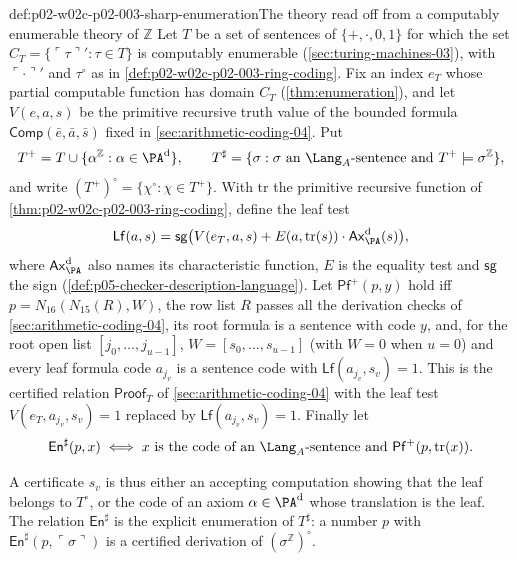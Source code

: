 \begin{hbdefinition}{def:p02-w02c-p02-003-sharp-enumeration}{The theory read off from a computably enumerable theory of \(\mathbb Z\)}
Let \(T\) be a set of sentences of \(\{+,\cdot,0,1\}\) for which the set
\(C_T=\{\ulcorner\tau\urcorner':\tau\in T\}\) is computably enumerable
(\cref{sec:turing-machines-03}), with \(\ulcorner\cdot\urcorner'\) and
\(\tau^{\circ}\) as in \cref{def:p02-w02c-p02-003-ring-coding}.  Fix an
index \(e_T\) whose partial computable function has domain \(C_T\)
(\cref{thm:enumeration}), and let \(V(e,a,s)\) be the primitive recursive
truth value of the bounded formula
\(\mathsf{Comp}(\bar e,\bar a,\bar s)\) fixed in
\cref{sec:arithmetic-coding-04}.  Put
\[
 T^{+}=T\cup\{\alpha^{\mathbb Z}:\alpha\in\PA^{\rm d}\},\qquad
 T^{\sharp}=\{\sigma:\sigma\text{ an }\Lang_A\text{-sentence and }
 T^{+}\models\sigma^{\mathbb Z}\},
\]
and write \((T^{+})^{\circ}=\{\chi^{\circ}:\chi\in T^{+}\}\).  With
\(\mathrm{tr}\) the primitive recursive function of
\cref{thm:p02-w02c-p02-003-ring-coding}, define the leaf test
\[
 \mathsf{Lf}(a,s)=\mathsf{sg}\bigl(V(e_T,a,s)
       +E(a,\mathrm{tr}(s))\cdot\mathsf{Ax}^{\rm d}_{\PA}(s)\bigr),
\]
where \(\mathsf{Ax}^{\rm d}_{\PA}\) also names its characteristic
function, \(E\) is the equality test and \(\mathsf{sg}\) the sign
(\cref{def:p05-checker-description-language}).  Let
\(\mathsf{Pf}^{+}(p,y)\) hold iff \(p=N_{16}(N_{15}(R),W)\), the row list
\(R\) passes all the derivation checks of \cref{sec:arithmetic-coding-04},
its root formula is a sentence with code \(y\), and, for the root open list
\([j_0,\ldots,j_{u-1}]\), \(W=[s_0,\ldots,s_{u-1}]\) (with \(W=0\) when
\(u=0\)) and every leaf formula code \(a_{j_v}\) is a sentence code with
\(\mathsf{Lf}(a_{j_v},s_v)=1\).  This is the certified relation
\(\mathsf{Proof}_T\) of \cref{sec:arithmetic-coding-04} with the leaf test
\(V(e_T,a_{j_v},s_v)=1\) replaced by \(\mathsf{Lf}(a_{j_v},s_v)=1\).
Finally let
\[
 \mathsf{En}^{\sharp}(p,x)\iff x\text{ is the code of an }
 \Lang_A\text{-sentence and }\mathsf{Pf}^{+}(p,\mathrm{tr}(x)).
\]
\end{hbdefinition}

A certificate \(s_v\) is thus either an accepting computation showing that
the leaf belongs to \(T^{\circ}\), or the code of an axiom
\(\alpha\in\PA^{\rm d}\) whose translation is the leaf.  The relation
\(\mathsf{En}^{\sharp}\) is the explicit enumeration of \(T^{\sharp}\): a
number \(p\) with \(\mathsf{En}^{\sharp}(p,\ulcorner\sigma\urcorner)\) is
a certified derivation of \((\sigma^{\mathbb Z})^{\circ}\).


